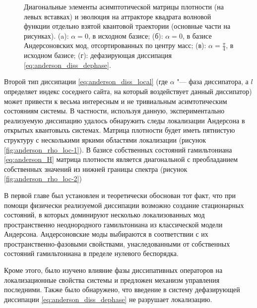 \begin{figure}[ht]
	\legend{}
	\caption[Динамика квантовых траекторий на квантовых аттракторах в зависимости от параметров неэрмитовой диссипации]
	{
		Диагональные элементы асимптотической матрицы плотности (на левых вставках) и эволюция на аттракторе квадрата волновой функции отдельно взятой квантовой траектории (основные части на рисунках). (a): \(\alpha = 0\), в исходном базисе; (б): \(\alpha = 0\), в базисе Андерсоновских мод, отсортированных по центру масс; (в): \(\alpha=\frac{\pi}{4}\), в исходном базисе; (г): дефазирующая диссипация \cref{eq:anderson_diss_dephase}. 
	}
	\label{fig:anderson_prb_2}
\end{figure}

Второй тип диссипации \cref{eq:anderson_diss_local} (где \(\alpha\) "--- фаза диссипатора, а \(l\) определяет индекс соседнего сайта, на который воздействует данный диссипатор) может привести к весьма интересным и не тривиальным асимтотическим состояниям системы. 
В частности, используя данную, экспериментально реализуемую диссипацию удалось обнаружить следы локализации Андерсона в открытых квантовыхь системах. Матрица плотности будет иметь пятнистую структуру с несколькими яркими областями локализации (рисунок \cref{fig:anderson_rho_loc-1}). 
В базисе собственных состояний гамильтониана \cref{eq:anderson_H} матрица плотности является диагональной с преобладанием собственных значений из нижней границы спектра (рисунок \cref{fig:anderson_rho_loc-2})

В первой главе был установлен и теоретически обоснован тот факт, что при помощи физически реализуемой диссипации возможно создание стационарных состояний, в которых доминируют несколько локализованных мод пространственно неоднородного гамильтониана из классической модели Андерсона. Андерсоновские моды выбираются в соответствии с их пространственно-фазовыми свойствами, унаследованными от собственных состояний гамильтониана в пределе нулевого беспорядка.

Кроме этого, было изучено влияние фазы диссипативных операторов на локализационные свойства системы и предложен механизм управления последними. Также было обнаружено, что введение в систему дефазирующей диссипации \cref{eq:anderson_diss_dephase} не разрушает локализацию.


